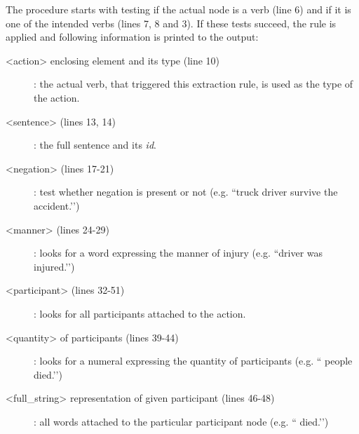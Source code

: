 The procedure starts with testing if the actual node is a verb (line 6) and if it is one of the intended verbs (lines 7, 8 and 3). If these tests succeed, the rule is applied and following information is printed to the output:
\begin{description}
	\item[<action> enclosing element and its type (line 10)]: the actual verb, that triggered this extraction rule, is used as the type of the action.
	\item[<sentence> (lines 13, 14)]: the full sentence and its \emph{id}.
	\item[<negation> (lines 17-21)]: test whether negation is present or not (e.g. ``truck driver  survive the accident.’’)
	\item[<manner> (lines 24-29)]: looks for a word expressing the manner of injury (e.g. ``driver was  injured.’’)
	\item[<participant> (lines 32-51)]: looks for all participants attached to the action.
	\item[<quantity> of participants (lines 39-44)]: looks for a numeral expressing the quantity of participants (e.g. `` people died.’’)
	\item[<full\_string> representation of given participant (lines 46-48)]: all words attached to the particular participant node (e.g. `` died.’’)
\end{description}





